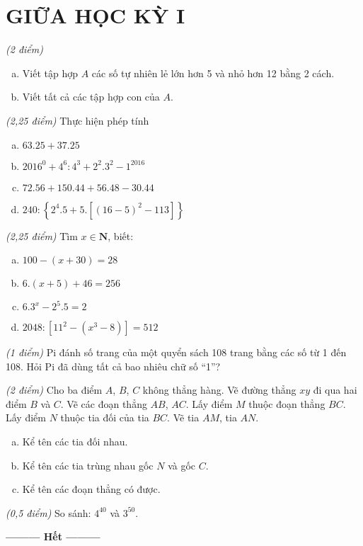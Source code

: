 \section{GIỮA HỌC KỲ I}
\setcounter{ex}{0}
\begin{ex} \textit{(2 điểm)}
\begin{enumerate} [a)]
\item Viết tập hợp $A$ các số tự nhiên lẻ lớn hơn 5 và nhỏ hơn 12 bằng 2 cách.
\item Viết tất cả các tập hợp con của $A$.
\end{enumerate}
\end{ex}    \begin{ex}  \textit{(2,25 điểm)} Thực hiện phép tính
\begin{enumerate} [a)]
\item $63.25 + 37.25$
\item ${2016^0} + {4^6}:{4^3} + {2^2}{.3^2} - {1^{2016}}$
\item $72.56 + 150.44 + 56.48 - 30.44$
\item $240:\left\{ {{2^4}.5 + 5.\left[ {{{\left( {16 - 5} \right)}^2} - 113} \right]} \right\}$
\end{enumerate}
\end{ex}    \begin{ex}  \textit{(2,25 điểm)} Tìm $x \in  \mathbf{N}$, biết:
 \begin{enumerate}[a)]
 \item $100 - \left( {x + 30} \right) = 28$
 \item $6.\left( {x + 5} \right) + 46 = 256$
 \item ${6.3^x} - {2^5}.5 = 2$
 \item $2048:\left[ {{{11}^2} - \left( {{x^3} - 8} \right)} \right] = 512$
 \end{enumerate}
\noindent \end{ex}    \begin{ex} \textit{(1 điểm)} Pi đánh số trang của một quyển sách 108 trang bằng các số từ 1 đến 108. Hỏi Pi đã dùng tất cả bao nhiêu chữ số “1”?\\
\end{ex}    \begin{ex} \textit{(2 điểm)} Cho ba điểm $A$, $B$, $C$ không thẳng hàng. Vẽ đường thẳng $xy$ đi qua hai điểm $B$ và $C$. Vẽ các đoạn thẳng $AB$, $AC$. Lấy điểm $M$ thuộc đoạn thẳng $BC$. Lấy điểm $N$ thuộc tia đối của tia $BC$. Vẽ tia $AM$, tia $AN$.
\begin{enumerate} [a)]
\item Kể tên các tia đối nhau. 
\item Kể tên các tia trùng nhau gốc $N$ và gốc $C$.
\item Kể tên các đoạn thẳng có được. 
\end{enumerate} 
\end{ex}    \begin{ex} \textit{(0,5 điểm)} So sánh: $4^{40}$ và $3^{50}$. 
\end{ex}
\begin{center}
\textbf{\textbf{---------} Hết \textbf{---------}}
\end{center}